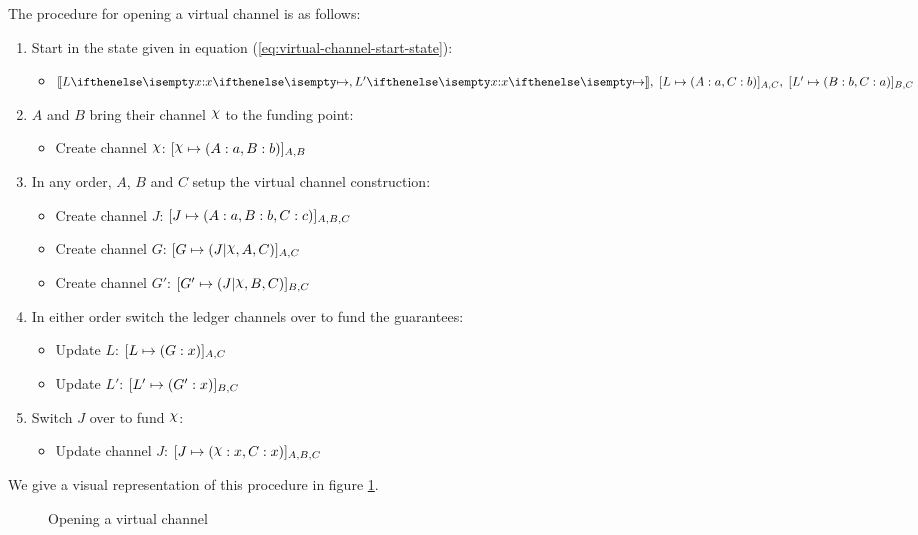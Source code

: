 \documentclass{article}
\begin{document}
The procedure for opening a virtual channel is as follows:
\begin{enumerate}
  \item Start in the state given in equation (\ref{eq:virtual-channel-start-state}):
  \begin{itemize}
    \item $\adj{\holds{L}{x}{}, \holds{L'}{x}{}}, \; \finalizable{L}{\alloc{A:a, C:b}}{A, C}, \; \finalizable{L'}{\alloc{B: b, C: a}}{B, C}$
  \end{itemize}
  \item $A$ and $B$ bring their channel $\rchi$ to the funding point:
  \begin{itemize}
    \item Create channel $\rchi$: $\finalizable{\rchi}{\alloc{A:a, B:b}}{A,B}$
  \end{itemize}
  \item In any order, $A$, $B$ and $C$ setup the virtual channel construction:
  \begin{itemize}
    \item Create channel $J$: $[J \mapsto ( A:a, B:b, C: c )]_{A, B, C}$
    \item Create channel $G$: $\finalizable{G}{\guar{J}{\rchi, A, C}}{A, C}$
    \item Create channel $G'$: $\finalizable{G'}{\guar{J}{\rchi, B, C}}{B, C}$
  \end{itemize}
  \item In either order switch the ledger channels over to fund the guarantees:
  \begin{itemize}
    \item Update $L$: $[L \mapsto ( G: x )]_{A,C}$
    \item Update $L'$: $[L' \mapsto ( G': x )]_{B,C}$
  \end{itemize}
  \item Switch $J$ over to fund $\rchi$:
  \begin{itemize}
    \item Update channel $J$: $\finalizable{J}{\alloc{\rchi: x, C: x}}{A, B, C}$
  \end{itemize}
\end{enumerate}
We give a visual representation of this procedure in figure \ref{fig:virtual-channel-opening}.

\begin{figure}[ht]
  \centering
  
  \caption{Opening a virtual channel}
  \label{fig:virtual-channel-opening}
\end{figure}
\end{document}
